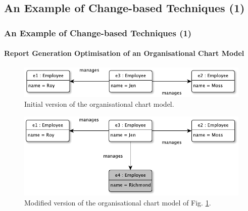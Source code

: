 \documentclass{beamer}
\begin{document}
\begin{frame}
\section{An Example of Change-based Techniques (1)}
\frametitle{An Example of Change-based Techniques (1)}
\label{sec:An example_of_change-based_techniques_1}
\framesubtitle{Report Generation Optimisation of an Organisational Chart Model}
\begin{figure}[ht]
\centering
\includegraphics[width=\linewidth]{initial_chart}
\caption{Initial version of the organisational chart model.}
\label{fig:initial_chart}
\end{figure}

\begin{figure}[ht]
\centering
\includegraphics[width=\linewidth]{modified_chart}
\caption{Modified version of the organisational chart model of Fig. \ref{fig:initial_chart}.}
\label{fig:modified_chart}
\end{figure}
\end{frame}
\end{document}
